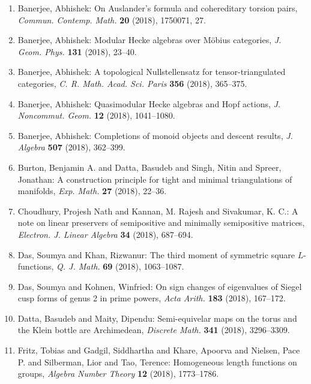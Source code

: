\begin{enumerate}[resume, leftmargin=27pt]
	\item Banerjee, Abhishek: On {A}uslander's formula and cohereditary torsion pairs, {\em Commun. Contemp. Math.} {\bf 20} (2018),
	      1750071, 27.

	\item Banerjee, Abhishek: Modular {H}ecke algebras over {M}\"{o}bius categories, {\em J. Geom. Phys.} {\bf 131} (2018), 23--40.

	\item Banerjee, Abhishek: A topological {N}ullstellensatz for tensor-triangulated
	      categories, {\em C. R. Math. Acad. Sci. Paris} {\bf 356} (2018), 365--375.

	\item Banerjee, Abhishek: Quasimodular {H}ecke algebras and {H}opf actions, {\em J. Noncommut. Geom.} {\bf 12} (2018), 1041--1080.

	\item Banerjee, Abhishek: Completions of monoid objects and descent results, {\em J. Algebra} {\bf 507} (2018), 362--399.

	\item Burton, Benjamin A. and Datta, Basudeb and Singh, Nitin and
	      Spreer, Jonathan: A construction principle for tight and minimal triangulations
	      of manifolds, {\em Exp. Math.} {\bf 27} (2018), 22--36.

	\item Choudhury, Projesh Nath and Kannan, M. Rajesh and Sivakumar,
	      K. C.: A note on linear preservers of semipositive and minimally
	      semipositive matrices, {\em Electron. J. Linear Algebra} {\bf 34} (2018), 687--694.

	\item Das, Soumya and Khan, Rizwanur: The third moment of symmetric square {$L$}-functions, {\em Q. J. Math.} {\bf 69} (2018),
	      1063--1087.

	\item Das, Soumya and Kohnen, Winfried: On sign changes of eigenvalues of {S}iegel cusp forms of genus
	      2 in prime powers, {\em Acta Arith.} {\bf 183} (2018), 167--172.

	\item Datta, Basudeb and Maity, Dipendu: Semi-equivelar maps on the torus and the {K}lein bottle are
		      {A}rchimedean, {\em Discrete Math.} {\bf 341} (2018), 3296--3309.

	\item Fritz, Tobias and Gadgil, Siddhartha and Khare, Apoorva and Nielsen, Pace P. and Silberman, Lior and Tao, Terence: Homogeneous length functions on groups, {\em Algebra Number Theory} {\bf 12} (2018), 1773--1786.


\end{enumerate}
